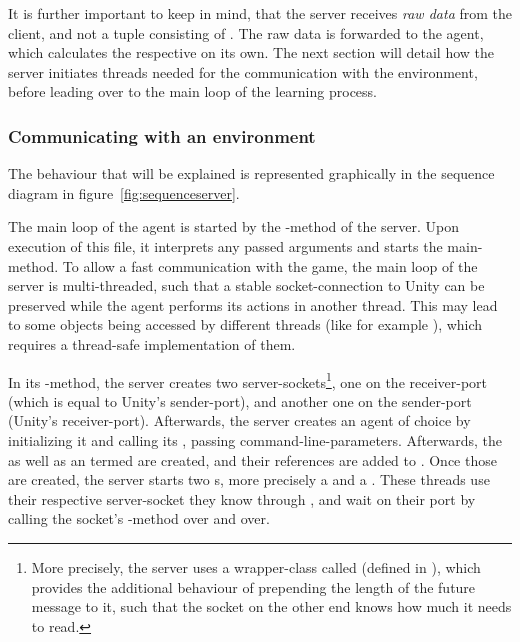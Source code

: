 It is further important to keep in mind, that the server receives \textit{raw data} from the client, and not a tuple consisting of . The raw data is forwarded to the agent, which calculates the respective  on its own. The next section will detail how the server initiates threads needed for the communication with the environment, before leading over to the main loop of the learning process.

\subsubsection{Communicating with an environment}

The behaviour that will be explained is represented graphically in the sequence diagram in figure~\ref{fig:sequenceserver}. 

The main loop of the agent is started by the -method of the server. Upon execution of this file, it interprets any passed arguments and starts the main-method. %
To allow a fast communication with the game, the main loop of the server is multi-threaded, such that a stable socket-connection to Unity can be preserved while the agent performs its actions in another thread. This may lead to some objects being accessed by different threads (like for example ), which requires a thread-safe implementation of them.

In its -method, the server creates two server-sockets\footnote{More precisely, the server uses a wrapper-class called  (defined in ), which provides the additional behaviour of prepending the length of the future message to it, such that the socket on the other end knows how much it needs to read.}, one on the receiver-port (which is equal to Unity's sender-port), and another one on the sender-port (Unity's receiver-port). Afterwards, the server creates an agent of choice by initializing it and calling its , passing command-line-parameters. Afterwards, the   as well as an  termed  are created, and their references are added to . Once those are created, the server starts two s, more precisely a  and a . These threads use their respective server-socket they know through , and wait on their port by calling the socket's -method over and over.

